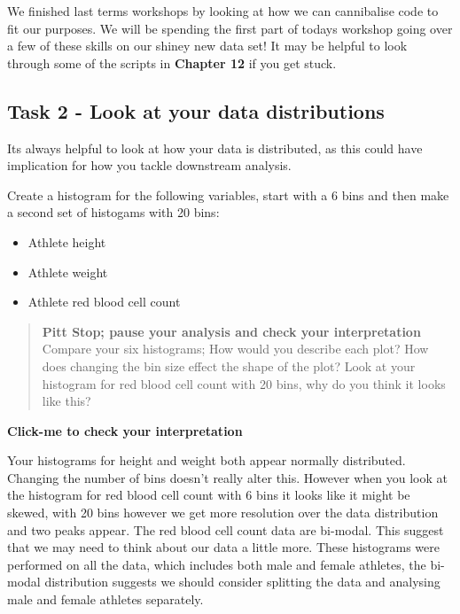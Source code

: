 \documentclass[
]{book}
\providecommand{\tightlist}{%
  \setlength{\itemsep}{0pt}\setlength{\parskip}{0pt}}
\begin{document}
We finished last terms workshops by looking at how we can cannibalise code to fit our purposes. We will be spending the first part of todays workshop going over a few of these skills on our shiney new data set! It may be helpful to look through some of the scripts in \textbf{Chapter 12} if you get stuck.

\hypertarget{task-2---look-at-your-data-distributions}{%
\subsection{Task 2 - Look at your data distributions}\label{task-2---look-at-your-data-distributions}}

Its always helpful to look at how your data is distributed, as this could have implication for how you tackle downstream analysis.

Create a histogram for the following variables, start with a 6 bins and then make a second set of histogams with 20 bins:

\begin{itemize}
\tightlist
\item
  Athlete height
\item
  Athlete weight
\item
  Athlete red blood cell count
\end{itemize}

\begin{quote}
\textbf{Pitt Stop; pause your analysis and check your interpretation}
Compare your six histograms;
How would you describe each plot?
How does changing the bin size effect the shape of the plot?
Look at your histogram for red blood cell count with 20 bins, why do you think it looks like this?
\end{quote}

\textbf{Click-me to check your interpretation}

Your histograms for height and weight both appear normally distributed. Changing the number of bins doesn't really alter this. However when you look at the histogram for red blood cell count with 6 bins it looks like it might be skewed, with 20 bins however we get more resolution over the data distribution and two peaks appear. The red blood cell count data are bi-modal. This suggest that we may need to think about our data a little more. These histograms were performed on all the data, which includes both male and female athletes, the bi-modal distribution suggests we should consider splitting the data and analysing male and female athletes separately.
\end{document}

